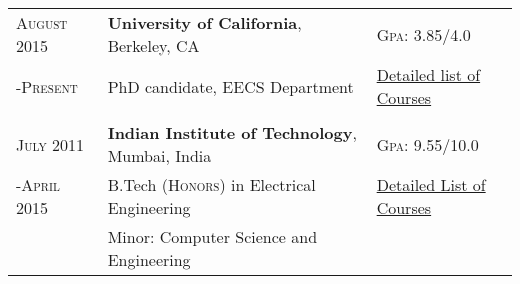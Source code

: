 
\begin{tabular}{lll}	
	\textsc{August} 2015	& \textbf{University of California}, Berkeley, CA		& \normalsize \textsc{Gpa}: 3.85/4.0 \\
	-\textsc{Present}	& PhD candidate, EECS Department				& \hyperlink{grds_ucb}{\footnotesize Detailed list of Courses} \\
				&								& \\
	\textsc{July} 2011  	& \textbf{Indian Institute of Technology}, Mumbai, India 	& \normalsize \textsc{Gpa}: 9.55/10.0 \\ 
	-\textsc{April} 2015 	& B.Tech (\textsc{Honors}) in Electrical Engineering		& \hyperlink{grds_IIT}{\footnotesize Detailed List of Courses} \\
				& Minor: Computer Science and Engineering\\
\end{tabular}
